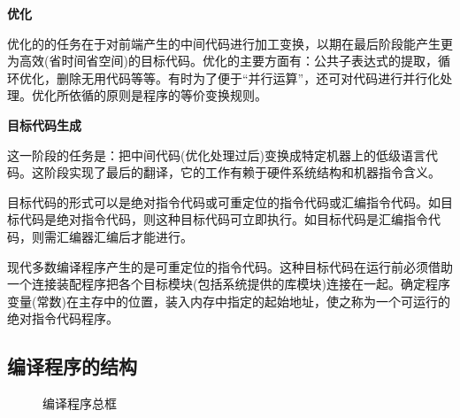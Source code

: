 \noindent\textbf{优化}

优化的的任务在于对前端产生的中间代码进行加工变换，以期在最后阶段能产生更为高效(省时间省空间)的目标代码。优化的主要方面有：公共子表达式的提取，循环优化，删除无用代码等等。有时为了便于``并行运算''，还可对代码进行并行化处理。优化所依循的原则是程序的等价变换规则。

\noindent\textbf{目标代码生成}

这一阶段的任务是：把中间代码(优化处理过后)变换成特定机器上的低级语言代码。这阶段实现了最后的翻译，它的工作有赖于硬件系统结构和机器指令含义。

目标代码的形式可以是绝对指令代码或可重定位的指令代码或汇编指令代码。如目标代码是绝对指令代码，则这种目标代码可立即执行。如目标代码是汇编指令代码，则需汇编器汇编后才能进行。

现代多数编译程序产生的是可重定位的指令代码。这种目标代码在运行前必须借助一个连接装配程序把各个目标模块(包括系统提供的库模块)连接在一起。确定程序变量(常数)在主存中的位置，装入内存中指定的起始地址，使之称为一个可运行的绝对指令代码程序。

\subsection{编译程序的结构}

\begin{figure}[H]
    \centering
    \caption{编译程序总框}
    \label{编译程序总框}
\end{figure}